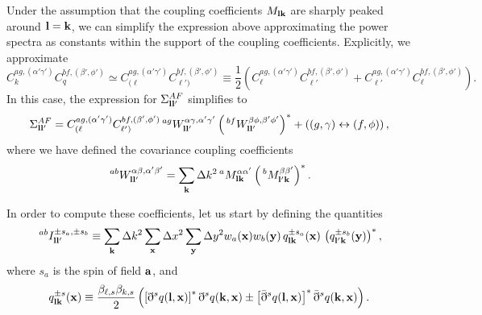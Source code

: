 \documentclass[a4paper,11pt]{article}
\newcommand{\summ}[1]{\sum_{\bf #1}\Delta #1^2}
\begin{document}
    Under the assumption that the coupling coefficients $M_{{\bf l}{\bf k}}$ are sharply peaked around ${\bf l}={\bf k}$, we can simplify the expression above approximating the power spectra as constants within the support of the coupling coefficients. Explicitly, we approximate 
    \begin{equation}\nonumber
     C^{ag,(\alpha'\gamma')}_kC^{bf,(\beta',\phi')}_q\simeq C^{ag,(\alpha'\gamma')}_{(\ell}C^{bf,(\beta',\phi')}_{\ell')}\equiv\frac{1}{2}\left(C^{ag,(\alpha'\gamma')}_\ell C^{bf,(\beta',\phi')}_{\ell'}+C^{ag,(\alpha'\gamma')}_{\ell'} C^{bf,(\beta',\phi')}_\ell\right).
    \end{equation}
    In this case, the expression for $\Sigma^{AF}_{{\bf l}{\bf l}'}$ simplifies to
    \begin{align}\label{eq:covar_efstathiou}
      \Sigma^{AF}_{{\bf l}{\bf l}'}=C^{ag,(\alpha'\gamma')}_{(\ell}C^{bf,(\beta',\phi')}_{\ell')}\,^{ag}W^{\alpha\gamma,\alpha'\gamma'}_{{\bf l}{\bf l}'}\left(\,^{bf}W^{\beta\phi,\beta'\phi'}_{{\bf l}{\bf l}'}\right)^*+\left((g,\gamma)\leftrightarrow(f,\phi)\right),
    \end{align}
    where we have defined the covariance coupling coefficients
    \begin{equation}\label{eq:covar_coupling}
      \,^{ab}W^{\alpha\beta,\alpha'\beta'}_{{\bf l}{\bf l}'}=\summ{k}\,^aM^{\alpha\alpha'}_{{\bf l}{\bf k}}\left(\,^bM^{\beta\beta'}_{{\bf l}'{\bf k}}\right)^*.
    \end{equation}

    In order to compute these coefficients, let us start by defining the quantities
    \begin{equation}
      \,^{ab}I^{\pm s_a,\pm s_b}_{{\bf l}{\bf l'}}\equiv\summ{k}\summ{x}\summ{y}w_a({\bf x})w_b({\bf y})\,q^{\pm s_a}_{{\bf l}{\bf k}}({\bf x})\,\left(q^{\pm s_b}_{{\bf l}'{\bf k}}({\bf y})\right)^*,
    \end{equation}
    where $s_a$ is the spin of field ${\bf a}$, and
    \begin{equation}
      q^{\pm s}_{{\bf l}{\bf k}}({\bf x})\equiv \frac{\beta_{\ell,s}\beta_{k,s}}{2}\left(\left[\eth^s q({\bf l},{\bf x})\right]^* \eth^sq({\bf k},{\bf x})\pm\left[\bar{\eth}^sq({\bf l},{\bf x})\right]^*\bar{\eth}^sq({\bf k},{\bf x})\right).
    \end{equation}
\end{document}
